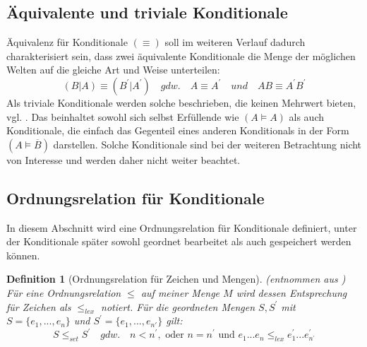 \documentclass[12pt,a4paper]{article}
\newtheorem{theorem}{Definition}
\begin{document}
\subsection{Äquivalente und triviale Konditionale}
\label{sec:äquivalenz-konditionale}
Äquivalenz für Konditionale $(\equiv)$ soll im weiteren Verlauf dadurch charakterisiert sein, dass zwei äquivalente Konditionale die Menge der möglichen Welten auf die gleiche Art und Weise unterteilen:
\begin{equation}
(B|A)\equiv (B^\prime|A^\prime) \quad gdw. \quad A\equiv A^\prime \quad und \quad AB \equiv A^\prime B^\prime
\end{equation}
Als triviale Konditionale werden solche beschrieben, die keinen Mehrwert bieten, vgl. \cite{beierle19}. Das beinhaltet sowohl sich selbst Erfüllende wie $(A \models A)$ als auch Konditionale, die einfach das Gegenteil eines anderen Konditionals in der Form $(A \models \overline{B})$ darstellen. Solche Konditionale sind bei der weiteren Betrachtung nicht von Interesse und werden daher nicht weiter beachtet.


\subsection{Ordnungsrelation für Konditionale}
\label{sec:ordnungsrelation}
In diesem Abschnitt wird eine Ordnungsrelation für Konditionale definiert, unter der Konditionale später sowohl geordnet bearbeitet als auch gespeichert werden können.
\begin{theorem}[Ordnungsrelation für Zeichen und Mengen](entnommen aus \cite{beierle19}) \ \\
Für eine Ordnungsrelation $\leqslant$ auf meiner Menge $M$ wird dessen Entsprechung für Zeichen als $\leqslant_{lex}$ notiert. Für die geordneten Mengen $S, S^\prime$ mit $S = \{e_1, ..., e_n\}$ und $S^\prime = \{e_{1}, ... , e_{n\prime}\}$ gilt:
\begin{equation}
 S \leqslant_{set} S ^\prime \quad gdw. \quad n<n^\prime, \text{ oder } n = n ^\prime \text{ und } e_1...e_n  \leqslant_{lex}  e_1^\prime ... e_{n^\prime}^\prime
\end{equation}
\label{def:sortierung-konditionale}
\end{theorem}
\end{document}
